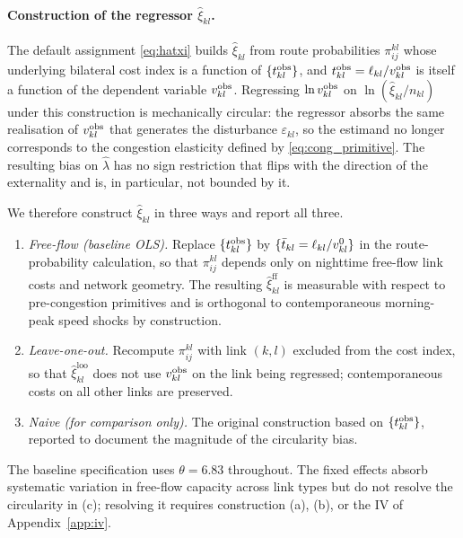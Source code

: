 \paragraph{Construction of the regressor $\hat\xi_{kl}$.}
The default assignment \eqref{eq:hatxi} builds $\hat\xi_{kl}$ from
route probabilities $\pi^{kl}_{ij}$ whose underlying bilateral cost
index is a function of $\{t_{kl}^{\mathrm{obs}}\}$, and
$t_{kl}^{\mathrm{obs}}=\ell_{kl}/v_{kl}^{\mathrm{obs}}$ is itself a function of the
dependent variable $v_{kl}^{\mathrm{obs}}$.  Regressing $\ln v_{kl}^{\mathrm{obs}}$
on $\ln(\hat\xi_{kl}/n_{kl})$ under this construction is mechanically
circular: the regressor absorbs the same realisation of $v_{kl}^{\mathrm{obs}}$
that generates the disturbance $\varepsilon_{kl}$, so the estimand no
longer corresponds to the congestion elasticity defined by
\eqref{eq:cong_primitive}.  The resulting bias on $\hat\lambda$ has
no sign restriction that flips with the direction of the externality
and is, in particular, not bounded by it.

We therefore construct $\hat\xi_{kl}$ in three ways and report all
three.
\begin{enumerate}[label=(\alph*),leftmargin=2em,itemsep=0.15em]
  \item \emph{Free-flow (baseline OLS).}  Replace $\{t_{kl}^{\mathrm{obs}}\}$
        by $\{\bar t_{kl}=\ell_{kl}/v^{0}_{kl}\}$ in the route-probability
        calculation, so that $\pi^{kl}_{ij}$ depends only on nighttime
        free-flow link costs and network geometry.  The resulting
        $\hat\xi_{kl}^{\text{ff}}$ is measurable with respect to
        pre-congestion primitives and is orthogonal to
        contemporaneous morning-peak speed shocks by construction.
  \item \emph{Leave-one-out.}  Recompute $\pi^{kl}_{ij}$ with link
        $(k,l)$ excluded from the cost index, so that
        $\hat\xi_{kl}^{\text{loo}}$ does not use $v_{kl}^{\mathrm{obs}}$ on
        the link being regressed; contemporaneous costs on all other
        links are preserved.
  \item \emph{Naive (for comparison only).}  The original
        construction based on $\{t_{kl}^{\mathrm{obs}}\}$, reported to
        document the magnitude of the circularity bias.
\end{enumerate}
The baseline specification uses $\theta=6.83$ throughout.  The
fixed effects absorb systematic variation in free-flow capacity
across link types but do not resolve the circularity in (c);
resolving it requires construction (a), (b), or the IV of
Appendix~\ref{app:iv}.


